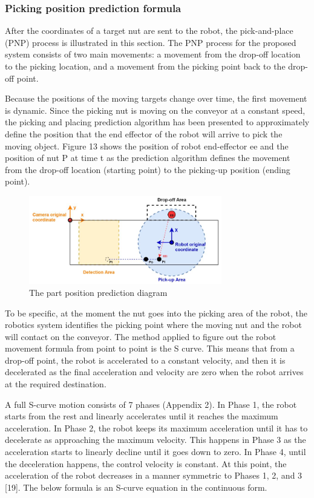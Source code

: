 \documentclass[10pt, letterpaper]{article}
\begin{document}
\subsubsection*{Picking position prediction formula}
    After the coordinates of a target nut are sent to the robot, the pick-and-place (PNP) process is illustrated in this section. The PNP process for the proposed system consists of two main movements: a movement from the drop-off location to the picking location, and a movement from the picking point back to the drop-off point.\par
    Because the positions of the moving targets change over time, the first movement is dynamic. Since the picking nut is moving on the conveyor at a constant speed, the picking and placing prediction algorithm has been presented to approximately define the position that the end effector of the robot will arrive to pick the moving object. Figure 13 shows the position of robot end-effector ee and the position of nut P at time t as the prediction algorithm defines the movement from the drop-off location (starting point) to the picking-up position (ending point).\par
    \begin{figure}[h]
        \centering
        \includegraphics[width=0.75\textwidth]{fig13.JPG}
        \caption{The part position prediction diagram}
    \end{figure}
    To be specific, at the moment the nut goes into the picking area of the robot, the robotics system identifies the picking point where the moving nut and the robot will contact on the conveyor. The method applied to figure out the robot movement formula from point to point is the S curve. This means that from a drop-off point, the robot is accelerated to a constant velocity, and then it is decelerated as the final acceleration and velocity are zero when the robot arrives at the required destination.\par
    A full S-curve motion consists of 7 phases (Appendix 2). In Phase 1, the robot starts from the rest and linearly accelerates until it reaches the maximum acceleration. In Phase 2, the robot keeps its maximum acceleration until it has to decelerate as approaching the maximum velocity. This happens in Phase 3 as the acceleration starts to linearly decline until it goes down to zero. In Phase 4, until the deceleration happens, the control velocity is constant. At this point, the acceleration of the robot decreases in a manner symmetric to Phases 1, 2, and 3 [19]. The below formula is an S-curve equation in the continuous form.\par
\end{document}
